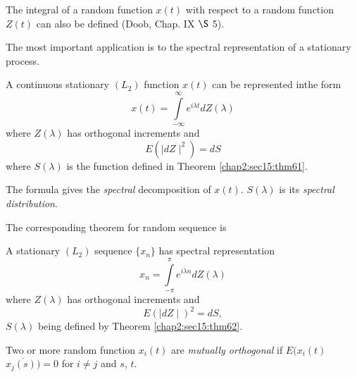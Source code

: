 The integral of a random function $x(t)$ with respect to a random
function $Z(t)$ can also be defined (Doob, Chap. IX $\S$ 5). 

The most important application is to the spectral representation of a
stationary process. 

\begin{theorem}\label{chap2:sec15:thm65}%
  A continuous stationary $(L_2)$ function $x(t)$ can be represented
  in\pageoriginale the form
  $$
  x(t)=  \int\limits^{\infty} _{-\infty}e ^ {i  \lambda t}  d Z
  (\lambda)
  $$
  where $Z(\lambda)$ has orthogonal increments and
  $$ 
  E (\mid dZ \mid^2)= dS 
  $$ 
  where $S(\lambda)$ is the function defined in
  Theorem \ref{chap2:sec15:thm61}.
  
  The formula gives the \textit{spectral} decomposition of $x (t)$. $S(\lambda)$
  is its \textit{spectral distribution}.
  
  The corresponding theorem for random sequence is 
\end{theorem}

\begin{theorem}\label{chap2:sec15:thm66}%
  A stationary $(L_{2})$ sequence $ \big\{x_n\big\}$ has spectral representation
  $$ 
  x_n = \int\limits^\pi _{-\pi} e ^{i \lambda n}   dZ (\lambda)
  $$
  where $Z(\lambda)$ has orthogonal increments and
  $$ 
  E (\mid dZ \mid)^2 = dS,
  $$
  $S (\lambda)$ being defined by Theorem \ref{chap2:sec15:thm62}.
  
  Two or more random function $x_i (t)$ are \textit{mutually orthogonal} if $E
  (x_i (t)$ $  \overline {x_j(s))} =0 $ for $i \neq j$ and $s$, $t$.   
\end{theorem}

